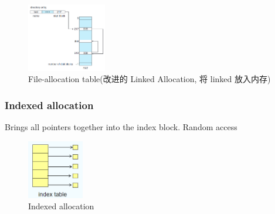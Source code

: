 \begin{figure}[!htb]
    \centering
    \includegraphics[width=0.309\textwidth]{pic/OS11/File-allocation table}
    \caption{File-allocation table(改进的 Linked Allocation, 将 linked 放入内存)}
\end{figure}

\subsubsection{Indexed allocation}
Brings all pointers together into the index block. Random access
\begin{figure}[!htb]
    \centering
    \includegraphics[width=0.22\textwidth]{pic/OS11/Indexed allocation}
    \caption{Indexed allocation}
\end{figure}

